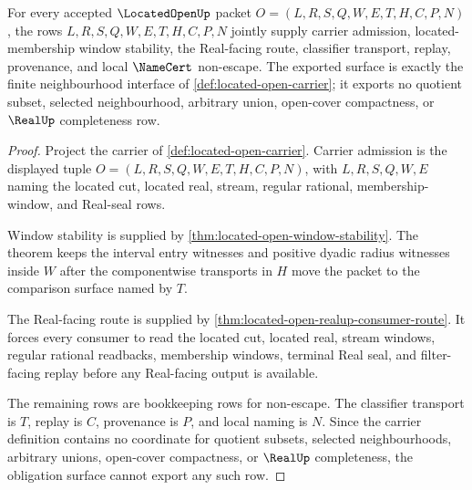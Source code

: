 \begin{theorem}
\label{thm:located-open-obligation-surface}
For every accepted $\LocatedOpenUp$ packet
$O=(L,R,S,Q,W,E,T,H,C,P,N)$, the rows $L,R,S,Q,W,E,T,H,C,P,N$ jointly supply
carrier admission, located-membership window stability, the Real-facing route,
classifier transport, replay, provenance, and local $\NameCert$ non-escape.
The exported surface is exactly the finite neighbourhood interface of
\autoref{def:located-open-carrier}; it exports no quotient subset, selected
neighbourhood, arbitrary union, open-cover compactness, or $\RealUp$
completeness row.
\end{theorem}
\begin{proof}
Project the carrier of \autoref{def:located-open-carrier}. Carrier admission
is the displayed tuple $O=(L,R,S,Q,W,E,T,H,C,P,N)$, with $L,R,S,Q,W,E$ naming
the located cut, located real, stream, regular rational, membership-window, and
Real-seal rows.

Window stability is supplied by
\autoref{thm:located-open-window-stability}. The theorem keeps the interval
entry witnesses and positive dyadic radius witnesses inside $W$ after the
componentwise transports in $H$ move the packet to the comparison surface
named by $T$.

The Real-facing route is supplied by
\autoref{thm:located-open-realup-consumer-route}. It forces every consumer to
read the located cut, located real, stream windows, regular rational readbacks,
membership windows, terminal Real seal, and filter-facing replay before any
Real-facing output is available.

The remaining rows are bookkeeping rows for non-escape. The classifier
transport is $T$, replay is $C$, provenance is $P$, and local naming is $N$.
Since the carrier definition contains no coordinate for quotient subsets,
selected neighbourhoods, arbitrary unions, open-cover compactness, or
$\RealUp$ completeness, the obligation surface cannot export any such row.
\end{proof}

